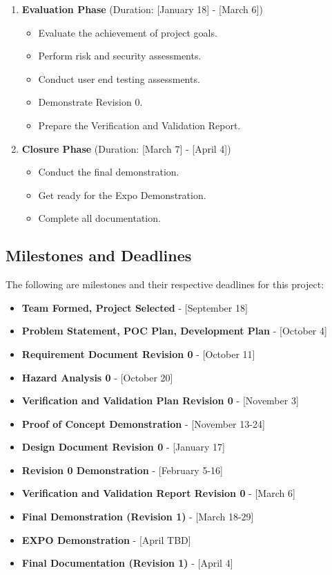 \documentclass{article}
\begin{document}
\begin{enumerate}
  \item \textbf{Evaluation Phase} (Duration: [January 18] - [March 6])
  \begin{itemize}
    \item Evaluate the achievement of project goals.
    \item Perform risk and security assessments.
    \item Conduct user end testing assessments.
    \item Demonstrate Revision 0.
    \item Prepare the Verification and Validation Report.
  \end{itemize}

  \item \textbf{Closure Phase} (Duration: [March 7] - [April 4])
  \begin{itemize}
    \item Conduct the final demonstration.
    \item Get ready for the Expo Demonstration.
    \item Complete all documentation.
  \end{itemize}
\end{enumerate}


\subsection{Milestones and Deadlines}

The following are milestones and their respective deadlines for this project:

\begin{itemize}
  \item \textbf{Team Formed, Project Selected} - [September 18]
  \item \textbf{Problem Statement, POC Plan, Development Plan} - [October 4]
  \item \textbf{Requirement Document  Revision 0} - [October 11]
  \item \textbf{Hazard Analysis 0} - [October 20]
  \item \textbf{Verification and Validation Plan Revision 0} - [November 3]
  \item \textbf{Proof of Concept Demonstration} - [November 13-24]
  \item \textbf{Design Document Revision 0} - [January 17]
  \item \textbf{Revision 0 Demonstration} - [February 5-16]
  \item \textbf{Verification and Validation Report Revision 0} - [March 6]
  \item \textbf{Final Demonstration (Revision 1)} - [March 18-29]
  \item \textbf{EXPO Demonstration} - [April TBD]
  \item \textbf{Final Documentation (Revision 1)} - [April 4]
\end{itemize}
\end{document}
